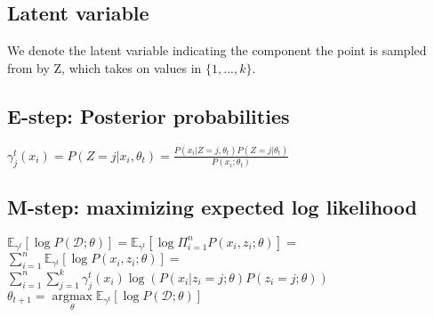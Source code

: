 \subsection*{Latent variable}
We denote the latent variable indicating the component the point is sampled from by Z, which takes on values in $\{1,...,k\}$.

\subsection*{E-step: Posterior probabilities}
$\gamma_j^t(x_i) = P(Z=j|x_i, \theta_t) = \frac{P(x_i|Z=j, \theta_t) P(Z=j|\theta_t)}{P(x_i;\theta_t)}$

\subsection*{M-step: maximizing expected log likelihood}
$\mathbb{E}_{\gamma^t}[\log P(\mathcal{D;\theta})] = 
\mathbb{E}_{\gamma^t}[\log \Pi_{i=1}^nP(x_i,z_i;\theta)] = $ \\
$\sum_{i=1}^n \mathbb{E}_{\gamma^t}[\log P(x_i,z_i;\theta)] = $ \\
$\sum_{i=1}^n \sum_{j=1}^k \gamma_j^t(x_i) \log (P(x_i|z_i=j;\theta) P(z_i=j;\theta))$ \\
$\theta_{t+1} = \underset{\theta}{\operatorname{argmax}} \mathbb{E}_{\gamma^t}[\log P(\mathcal{D;\theta})]$
\fi